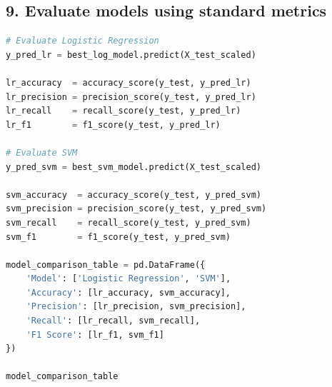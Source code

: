 \documentclass[11pt]{article}
\begin{document}
\subsection*{9. Evaluate models using standard metrics}
\begin{lstlisting}[language=Python]
# Evaluate Logistic Regression
y_pred_lr = best_log_model.predict(X_test_scaled)

lr_accuracy  = accuracy_score(y_test, y_pred_lr)
lr_precision = precision_score(y_test, y_pred_lr)
lr_recall    = recall_score(y_test, y_pred_lr)
lr_f1        = f1_score(y_test, y_pred_lr)

# Evaluate SVM 
y_pred_svm = best_svm_model.predict(X_test_scaled)

svm_accuracy  = accuracy_score(y_test, y_pred_svm)
svm_precision = precision_score(y_test, y_pred_svm)
svm_recall    = recall_score(y_test, y_pred_svm)
svm_f1        = f1_score(y_test, y_pred_svm)

model_comparison_table = pd.DataFrame({
    'Model': ['Logistic Regression', 'SVM'],
    'Accuracy': [lr_accuracy, svm_accuracy],
    'Precision': [lr_precision, svm_precision],
    'Recall': [lr_recall, svm_recall],
    'F1 Score': [lr_f1, svm_f1]
})

model_comparison_table

\end{lstlisting}
\end{document}
